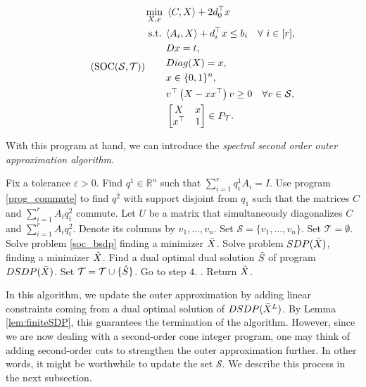 \documentclass{article}
\begin{document}
\begin{gather}\label{soc_bsdp}\tag{SOC($\mathcal{S},\mathcal{T}$)}
\begin{aligned}
\min_{X, x } \ & \left \langle C,X \right \rangle  + 2d_0^\top x \\
\text{ s.t. } & \langle A_i,X \rangle + d_i^\top x \leq b_i \quad \forall \ i \in [r], \\
&   D x  = t, \\
&  Diag(X)=x, \\
& x \in \{0,1\}^n,\\
& v^\top \left  (X-xx^\top\right)v  \geq 0 \quad \forall v\in \mathcal{S}, \\
& \begin{bmatrix}
X & x \\
x^\top & 1 
\end{bmatrix} \in P_{\mathcal{T}}.
\end{aligned}
\end{gather}
    
With this program at hand, we can introduce the \emph{spectral second order outer approximation algorithm}.


\begin{algorithm}
\caption{Spectral-second-order Outer-Approximation}
\label{alg_spec_soc_OA}
\begin{algorithmic}[1] 

\State Fix a tolerance $\varepsilon>0$. Find $q^1 \in \mathbb{R}^n$ such that $\sum_{i=1}^r q^1_iA_i = I$.  
\State Use program \eqref{prog_commute} to find $q^2$ with support disjoint from $q_1$ such that the matrices $C$ and $\sum_{i=1}^r A_iq_i^2$ commute. Let $U$ be a matrix that simultaneously diagonalizes $C$ and $\sum_{i=1}^r A_iq_i^2$. Denote its columns by $v_1,\dots, v_n$.
\State Set $\mathcal{S} = \{ v_1,\dots, v_n \}$. 
Set $\mathcal{T} = \emptyset.$
\State Solve problem \eqref{soc_bsdp} finding a minimizer $\Bar{X}$. 
\State Solve problem $SDP(\Bar{X})$, finding a minimizer $\Hat{X}$.
\State Find a dual optimal dual solution $\Hat{S}$ of program $DSDP(\Bar{X})$. 
\State Set $\mathcal{T} = \mathcal{T} \cup \{\Hat{S}\}$. Go to step $4$.
\EndIf.
\State Return $\Hat{X}$.
\end{algorithmic}
\end{algorithm}


In this algorithm, we update the outer approximation by adding linear constraints coming from a dual optimal solution of 
$DSDP(\Bar{X}^L)$. By Lemma \ref{lem:finiteSDP}, this guarantees the termination of the algorithm. However, since we are now dealing with a second-order cone integer program, one may think of adding second-order cuts to strengthen the outer approximation further. In other words, it might be worthwhile to update the set $\mathcal{S}$. We describe this process in the next subsection.
\end{document}
